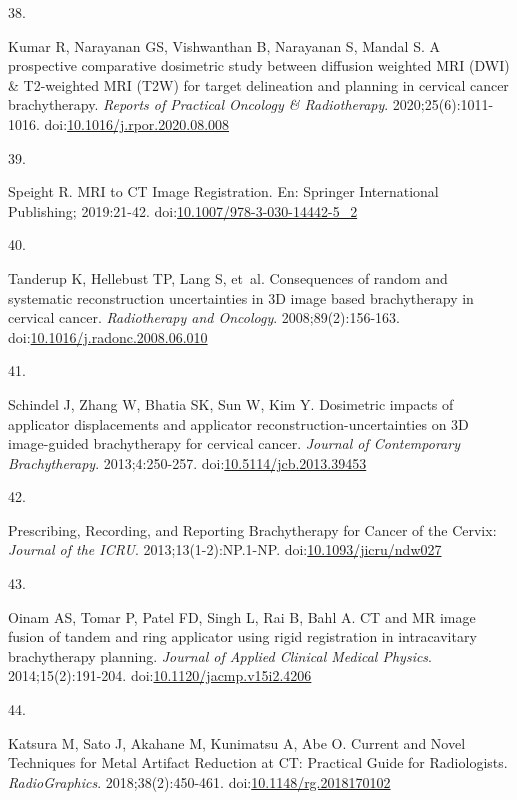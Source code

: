 \documentclass[
  a4paper,
]{scrreprt}
\newlength{\cslhangindent}
\newlength{\csllabelwidth}
\newlength{\cslentryspacingunit} %
\newenvironment{CSLReferences}[2] %
 {%
  \setlength{\parindent}{0pt}
  \ifodd #1
  \let\oldpar\par
  \def\par{\hangindent=\cslhangindent\oldpar}
  \fi
  \setlength{\parskip}{#2\cslentryspacingunit}
 }%
 {}
\newcommand{\CSLLeftMargin}[1]{\parbox[t]{\csllabelwidth}{#1}}
\newcommand{\CSLRightInline}[1]{\parbox[t]{\linewidth - \csllabelwidth}{#1}\break}
\begin{document}
\begin{CSLReferences}{0}{0}
\leavevmode{}%
\CSLLeftMargin{38. }%
\CSLRightInline{Kumar R, Narayanan GS, Vishwanthan B, Narayanan S,
Mandal S. A prospective comparative dosimetric study between diffusion
weighted MRI (DWI) \& T2-weighted MRI (T2W) for target delineation and
planning in cervical cancer brachytherapy. \emph{Reports of Practical
Oncology \& Radiotherapy}. 2020;25(6):1011-1016.
doi:\href{https://doi.org/10.1016/j.rpor.2020.08.008}{10.1016/j.rpor.2020.08.008}}

\leavevmode{}%
\CSLLeftMargin{39. }%
\CSLRightInline{Speight R. MRI to CT Image Registration. En: Springer
International Publishing; 2019:21-42.
doi:\href{https://doi.org/10.1007/978-3-030-14442-5_2}{10.1007/978-3-030-14442-5\_2}}

\leavevmode{}%
\CSLLeftMargin{40. }%
\CSLRightInline{Tanderup K, Hellebust TP, Lang S, et~al. Consequences of
random and systematic reconstruction uncertainties in 3D image based
brachytherapy in cervical cancer. \emph{Radiotherapy and Oncology}.
2008;89(2):156-163.
doi:\href{https://doi.org/10.1016/j.radonc.2008.06.010}{10.1016/j.radonc.2008.06.010}}

\leavevmode{}%
\CSLLeftMargin{41. }%
\CSLRightInline{Schindel J, Zhang W, Bhatia SK, Sun W, Kim Y. Dosimetric
impacts of applicator displacements and applicator
reconstruction-uncertainties on 3D image-guided brachytherapy for
cervical cancer. \emph{Journal of Contemporary Brachytherapy}.
2013;4:250-257.
doi:\href{https://doi.org/10.5114/jcb.2013.39453}{10.5114/jcb.2013.39453}}

\leavevmode{}%
\CSLLeftMargin{42. }%
\CSLRightInline{Prescribing, Recording, and Reporting Brachytherapy for
Cancer of the Cervix: \emph{Journal of the ICRU}. 2013;13(1-2):NP.1-NP.
doi:\href{https://doi.org/10.1093/jicru/ndw027}{10.1093/jicru/ndw027}}

\leavevmode{}%
\CSLLeftMargin{43. }%
\CSLRightInline{Oinam AS, Tomar P, Patel FD, Singh L, Rai B, Bahl A. CT
and MR image fusion of tandem and ring applicator using rigid
registration in intracavitary brachytherapy planning. \emph{Journal of
Applied Clinical Medical Physics}. 2014;15(2):191-204.
doi:\href{https://doi.org/10.1120/jacmp.v15i2.4206}{10.1120/jacmp.v15i2.4206}}

\leavevmode{}%
\CSLLeftMargin{44. }%
\CSLRightInline{Katsura M, Sato J, Akahane M, Kunimatsu A, Abe O.
Current and Novel Techniques for Metal Artifact Reduction at CT:
Practical Guide for Radiologists. \emph{RadioGraphics}.
2018;38(2):450-461.
doi:\href{https://doi.org/10.1148/rg.2018170102}{10.1148/rg.2018170102}}


\end{CSLReferences}
\end{document}

